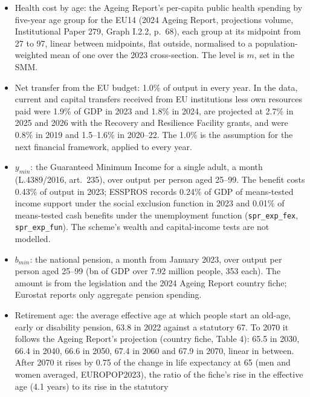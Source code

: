 \documentclass[11pt,a4paper]{article}
\newcommand{\EUR}[1]{\texteuro#1}
\begin{document}
\begin{itemize}
  Report's concept (ESSPROS, \texttt{spr\_exp\_pens}, 2023; the accounts'
  old-age and survivors functions alone give the same 14.0); public health
  5.3\%, of a total of 8.4\% with household health consumption from the
  national accounts; actual social contributions 11.2\%.
\item Health cost by age: the Ageing Report's per-capita public health
  spending by five-year age group for the EU14 (2024 Ageing Report,
  projections volume, Institutional Paper 279, Graph I.2.2, p.~68), each
  group at its midpoint from 27 to 97, linear between midpoints,
  flat outside, normalised to a population-weighted mean of one over the 2023
  cross-section. The level is $m$, set in the SMM.
\item Net transfer from the EU budget: 1.0\% of output in every year. In
  the data, current and capital transfers received from EU institutions
  less own resources paid were 1.9\% of GDP in 2023 and 1.8\% in 2024, are
  projected at 2.7\% in 2025 and 2026 with the Recovery and Resilience
  Facility grants, and were 0.8\% in 2019 and 1.5--1.6\% in 2020--22. The
  1.0\% is the assumption for the next financial framework, applied to
  every year.
\item $y_{min}$: the Guaranteed Minimum Income for a single adult, \EUR{200}
  a month (L.4389/2016, art.~235), over output per person aged 25--99. The
  benefit costs 0.43\% of output in 2023; ESSPROS records 0.24\% of GDP of
  means-tested income support under the social exclusion function in 2023
  and 0.01\% of means-tested cash benefits under the unemployment function
  (\texttt{spr\_exp\_fex}, \texttt{spr\_exp\_fun}). The scheme's wealth and
  capital-income tests are not modelled.
\item $b_{min}$: the national pension, \EUR{413.76} a month from January
  2023, over output per person aged 25--99 (\EUR{224.7}bn of GDP over 7.92
  million people, \EUR{28{,}353} each). The amount is from the legislation
  and the 2024 Ageing Report country fiche; Eurostat reports only aggregate
  pension spending.
\item Retirement age: the average effective age at which people start an
  old-age, early or disability pension, 63.8 in 2022 against a statutory 67.
  To 2070 it follows the Ageing Report's projection (country fiche, Table 4):
  65.5 in 2030, 66.4 in 2040, 66.6 in 2050, 67.4 in 2060 and 67.9 in 2070,
  linear in between. After 2070 it rises by 0.75 of the change in life
  expectancy at 65 (men and women averaged, EUROPOP2023), the ratio of the
  fiche's rise in the effective age (4.1 years) to its rise in the statutory

\end{itemize}
\end{document}
